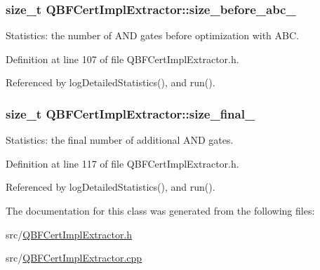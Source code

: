 \hypertarget{classQBFCertImplExtractor_a51eb6677e876d90d1b3763ca3e5457e7}{
\subsubsection[{size\-\_\-before\-\_\-abc\-\_\-}]{\setlength{\rightskip}{0pt plus 5cm}size\-\_\-t Q\-B\-F\-Cert\-Impl\-Extractor\-::size\-\_\-before\-\_\-abc\-\_\-\hspace{0.3cm}{\ttfamily [protected]}}}\label{classQBFCertImplExtractor_a51eb6677e876d90d1b3763ca3e5457e7}


Statistics\-: the number of A\-N\-D gates before optimization with A\-B\-C. 



Definition at line 107 of file Q\-B\-F\-Cert\-Impl\-Extractor.\-h.



Referenced by log\-Detailed\-Statistics(), and run().

\hypertarget{classQBFCertImplExtractor_ab22c545849fc2f85a49a846a836a5ec6}{
\subsubsection[{size\-\_\-final\-\_\-}]{\setlength{\rightskip}{0pt plus 5cm}size\-\_\-t Q\-B\-F\-Cert\-Impl\-Extractor\-::size\-\_\-final\-\_\-\hspace{0.3cm}{\ttfamily [protected]}}}\label{classQBFCertImplExtractor_ab22c545849fc2f85a49a846a836a5ec6}


Statistics\-: the final number of additional A\-N\-D gates. 



Definition at line 117 of file Q\-B\-F\-Cert\-Impl\-Extractor.\-h.



Referenced by log\-Detailed\-Statistics(), and run().



The documentation for this class was generated from the following files\-:\begin{DoxyCompactItemize}
\item 
src/\hyperlink{QBFCertImplExtractor_8h}{Q\-B\-F\-Cert\-Impl\-Extractor.\-h}\item 
src/\hyperlink{QBFCertImplExtractor_8cpp}{Q\-B\-F\-Cert\-Impl\-Extractor.\-cpp}\end{DoxyCompactItemize}
